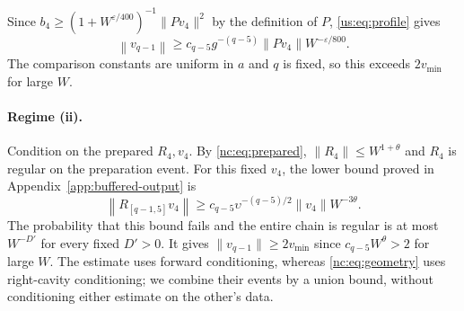 \documentclass[11pt]{article}
\numberwithin{equation}{section}
\theoremstyle{remark}
\newcommand{\norm}[1]{\left\|#1\right\|}
\begin{document}
Since $b_4\ge(1+W^{\varepsilon/400})^{-1}\|Pv_4\|^2$ by the definition of $P$,
\eqref{us:eq:profile} gives
\[
 \norm{v_{q-1}}\ge c_{q-5}g^{-(q-5)}\|Pv_4\|W^{-\varepsilon/800}.
\]
The comparison constants are uniform in $a$ and $q$ is fixed, so this
exceeds $2v_{\min}$ for large $W$.

\paragraph{Regime (ii).}
Condition on the prepared $R_4,v_4$. By \eqref{nc:eq:prepared},
$\|R_4\|\le W^{1+\theta}$ and $R_4$ is regular on the preparation event.
For this fixed $v_4$, the lower bound proved in
Appendix~\ref{app:buffered-output} is
\begin{equation}
 \norm{R_{[q-1,5]}v_4}\ge c_{q-5}\upsilon^{-(q-5)/2}\|v_4\|W^{-3\theta}.
 \label{nc:eq:profile}
\end{equation}
The probability that this bound fails and the entire chain is regular
is at most $W^{-D'}$ for every fixed $D'>0$. It gives
$\|v_{q-1}\|\ge2v_{\min}$ since $c_{q-5}W^\theta>2$ for large $W$.
The estimate uses forward conditioning, whereas
\eqref{nc:eq:geometry} uses right-cavity conditioning; we combine their
events by a union bound, without conditioning either estimate on the
other's data.
\end{document}
